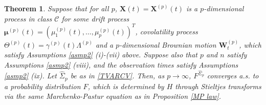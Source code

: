 \documentclass[a4paper,11pt]{article}
\theoremstyle{plain}
\newtheorem{thm}{Theorem}[part]%
\theoremstyle{definition}
\begin{document}
    \begin{thm} \label{Thm 2}
    	Suppose that for all $p$, $\mathbf{X}(t) = \mathbf{X}^{(p)}(t)$ is a $p$-dimensional process in class $\mathcal{C}$ for some drift process $\boldsymbol{\mu}^{(p)}(t) = (\mu_1^{(p)}(t), \dots , \mu_p^{(p)}(t))^T$, covolatility process $\Theta^{(p)}(t) = \gamma^{(p)}(t) \Lambda^{(p)}$ and a $p$-dimensional Brownian motion $\mathbf{W}_t^{(p)}$, which satisfy Assumptions \ref{asmp2} (i)-(vii) above. Suppose also that $p$ and $n$ satisfy Assumptions \ref{asmp2} (viii), and the observation times satisfy Assumptions \ref{asmp2} (ix). Let $\hat{\Sigma}_p$ be as in \eqref{TVARCV}. Then, as $p \rightarrow \infty$, $F^{\hat{\Sigma}_p}$ converges a.s. to a probability distribution $F$, which is determined by $H$ through Stieltjes transforms via the same Marchenko-Pastur equation as in Proposition \ref{MP law}.
    \end{thm}
\end{document}
